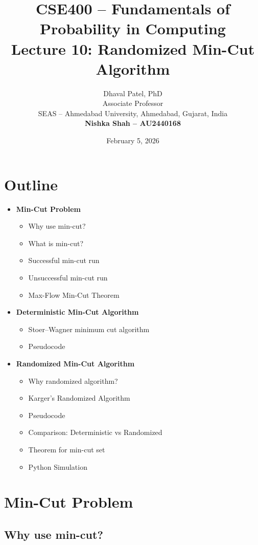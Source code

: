 \documentclass[12pt]{article}
\title{\textbf{CSE400 – Fundamentals of Probability in Computing}\\
\textbf{Lecture 10: Randomized Min-Cut Algorithm}}
\author{Dhaval Patel, PhD\\
Associate Professor\\
SEAS – Ahmedabad University, Ahmedabad, Gujarat, India\\[1em]
\textbf{Nishka Shah – AU2440168}}
\date{February 5, 2026}
\begin{document}
\maketitle

\section*{Outline}

\begin{itemize}
    \item \textbf{Min-Cut Problem}
    \begin{itemize}
        \item Why use min-cut?
        \item What is min-cut?
        \item Successful min-cut run
        \item Unsuccessful min-cut run
        \item Max-Flow Min-Cut Theorem
    \end{itemize}
    \item \textbf{Deterministic Min-Cut Algorithm}
    \begin{itemize}
        \item Stoer–Wagner minimum cut algorithm
        \item Pseudocode
    \end{itemize}
    \item \textbf{Randomized Min-Cut Algorithm}
    \begin{itemize}
        \item Why randomized algorithm?
        \item Karger’s Randomized Algorithm
        \item Pseudocode
        \item Comparison: Deterministic vs Randomized
        \item Theorem for min-cut set
        \item Python Simulation
    \end{itemize}
\end{itemize}

\section*{Min-Cut Problem}

\subsection*{Why use min-cut?}
\end{document}
